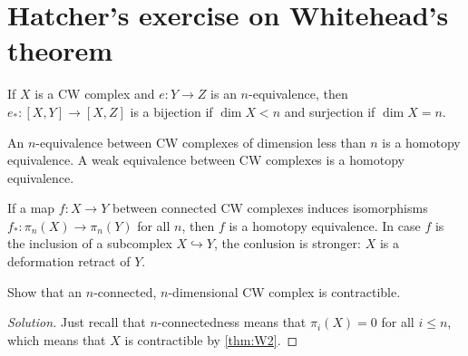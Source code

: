 \documentclass{article}
\numberwithin{equation}{section}
\begin{document}
\section{Hatcher's exercise on Whitehead's theorem}
\begin{thm}
	If $X$ is a CW complex and $e:Y\to Z$ is an $n$-equivalence, then $e_*:[X,Y]\to[X,Z]$ is a bijection if $\dim X<n$ and surjection if $\dim X=n$.
\end{thm}
\begin{thm}\label{thm:W2}
	An $n$-equivalence between CW complexes of dimension less than $n$ is a homotopy equivalence. A weak equivalence between CW complexes is a homotopy equivalence.
\end{thm}
\begin{thm}
	If a map $f:X\to Y$ between connected CW complexes induces isomorphisms $f_*:\pi_n(X)\to\pi_n(Y)$ for all $n$, then $f$ is a homotopy equivalence. In case $f$ is the inclusion of a subcomplex $X\hookrightarrow Y$, the conlusion is stronger: $X$ is a deformation retract of $Y$.
\end{thm}
\begin{exercise}[Hatcher 4.1.12]
	Show that an $n$-connected, $n$-dimensional CW complex is contractible.
\end{exercise}
\begin{proof}[Solution]
	Just recall that $n$-connectedness means that $\pi_i(X)=0$ for all $i\leq n$, which means that $X$ is contractible by \cref{thm:W2}.
\end{proof}
\printbibliography
\clearpage
\end{document}
